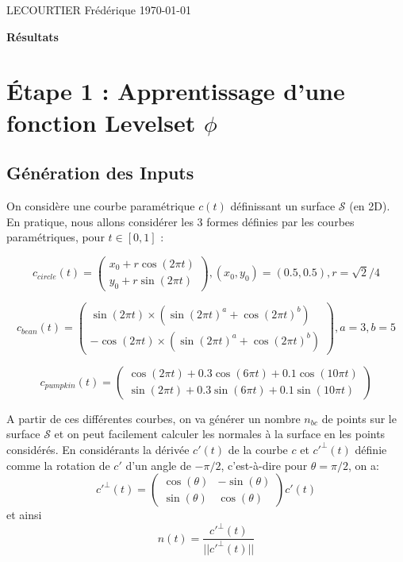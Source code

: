 \documentclass[french]{article}
\begin{document}
	LECOURTIER Frédérique \hfill \today
	\begin{center}
		\Large\textbf{{Résultats}}
	\end{center}
	\tableofcontents
	\newpage


	\section{Étape 1 : Apprentissage d'une fonction Levelset $\phi$}
	
	\subsection{Génération des Inputs}
	
	On considère une courbe paramétrique $c(t)$ définissant un surface $\mathcal{S}$ (en 2D). En pratique, nous allons considérer les 3 formes définies par les courbes paramétriques, pour $t\in [0,1]$ :
	
	\begin{equation*}
		c_{circle}(t) = \begin{pmatrix}
			x_0 + r\cos(2\pi t) \\
			y_0 + r\sin(2\pi t)
		\end{pmatrix}, (x_0,y_0)=(0.5,0.5), r=\sqrt{2}/4
	\end{equation*}
	
	\begin{equation*}
		c_{bean}(t) = \begin{pmatrix}
			\sin(2\pi t) \times (\sin(2\pi t)^a+\cos(2\pi t)^b) \\
			-\cos(2\pi t) \times (\sin(2\pi t)^a+\cos(2\pi t)^b)
		\end{pmatrix}, a=3, b=5
	\end{equation*}

	\begin{equation*}
		c_{pumpkin}(t) = \begin{pmatrix}
			 \cos(2\pi t)+0.3\cos(6\pi t)+0.1\cos(10\pi t) \\
			 \sin(2\pi t)+0.3\sin(6\pi t)+0.1\sin(10\pi t)
		\end{pmatrix}
	\end{equation*}

	A partir de ces différentes courbes, on va générer un nombre $n_{bc}$ de points sur le surface $\mathcal{S}$ et on peut facilement calculer les normales à la surface en les points considérés. En considérants la dérivée $c'(t)$ de la courbe $c$ et $c'^{\perp}(t)$ définie comme la rotation de $c'$ d'un angle de $-\pi/2$, c'est-à-dire pour $\theta=\pi/2$, on a:
	\begin{equation*}
		c'^{\perp}(t) = \begin{pmatrix}
			\cos(\theta) & -\sin(\theta) \\
			\sin(\theta) & \cos(\theta)
		\end{pmatrix}c'(t)
	\end{equation*}
	et ainsi
	\begin{equation*}
		n(t)=\frac{c'^{\perp}(t)}{||c'^{\perp}(t)||}
	\end{equation*}
	
\end{document}
